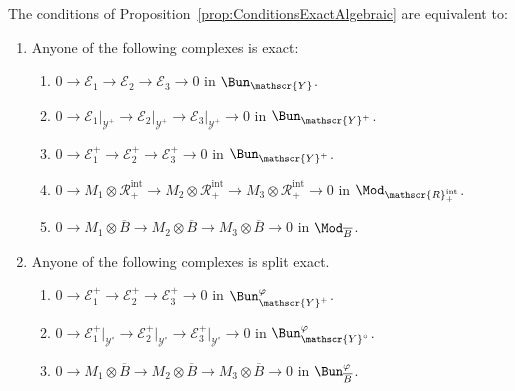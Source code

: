 \begin{prop}\label{prop:ConditionsExactnessAdic}
The conditions of Proposition~\ref{prop:ConditionsExactAlgebraic} are equivalent to:
\begin{enumerate}
\item \label{1} Anyone of the following complexes is exact:
\begin{enumerate}
\item \label{1a}
$0\rightarrow\mathscr{E}_{1}\rightarrow\mathscr{E}_{2}\rightarrow\mathscr{E}_{3}\rightarrow0$ in $\Bun_{\mathscr{Y}}$.
\item \label{1b} $0\rightarrow\mathscr{E}_{1}\vert_{\mathscr{Y}^{+}}\rightarrow\mathscr{E}_{2}\vert_{\mathscr{Y}^{+}}\rightarrow\mathscr{E}_{3}\vert_{\mathscr{Y}^{+}}\rightarrow0$ in $\Bun_{\mathscr{Y}^{+}}$.
\item \label{1c} $0\rightarrow\mathscr{E}_{1}^{+}\rightarrow\mathscr{E}_{2}^{+}\rightarrow\mathscr{E}_{3}^{+}\rightarrow0$ in $\Bun_{\mathscr{Y}^{+}}$.
\item \label{1d} $0\rightarrow M_{1}\otimes\mathscr{R}_{+}^{\mathrm{int}}\rightarrow M_{2}\otimes\mathscr{R}_{+}^{\mathrm{int}}\rightarrow M_{3}\otimes\mathscr{R}_{+}^{\mathrm{int}}\rightarrow0$ in $\Mod_{\mathscr{R}_{+}^{\mathrm{int}}}$.
\item \label{1e} $0\rightarrow M_{1}\otimes\overline{B}\rightarrow M_{2}\otimes\overline{B}\rightarrow M_{3}\otimes\overline{B}\rightarrow0$ in $\Mod_{\overline{B}}$.
\end{enumerate}
\item \label{2} Anyone of the following complexes is split exact.
\begin{enumerate}
\item \label{2a} $0\rightarrow\mathscr{E}_{1}^{+}\rightarrow\mathscr{E}_{2}^{+}\rightarrow\mathscr{E}_{3}^{+}\rightarrow0$ in $\Bun_{\mathscr{Y}^{+}}^{\varphi}$.
\item \label{2b} $0\rightarrow\mathscr{E}_{1}^{+}\vert_{\mathscr{Y}^{\circ}}\rightarrow\mathscr{E}_{2}^{+}\vert_{\mathscr{Y}^{\circ}}\rightarrow\mathscr{E}_{3}^{+}\vert_{\mathscr{Y}^{\circ}}\rightarrow0$ in $\Bun_{\mathscr{Y}^{\circ}}^{\varphi}$.
\item \label{2c} $0\rightarrow M_{1}\otimes\overline{B}\rightarrow M_{2}\otimes\overline{B}\rightarrow M_{3}\otimes\overline{B}\rightarrow0$ in $\Bun_{\overline{B}}^{\varphi}$.
\end{enumerate}
\end{enumerate}
\end{prop}

